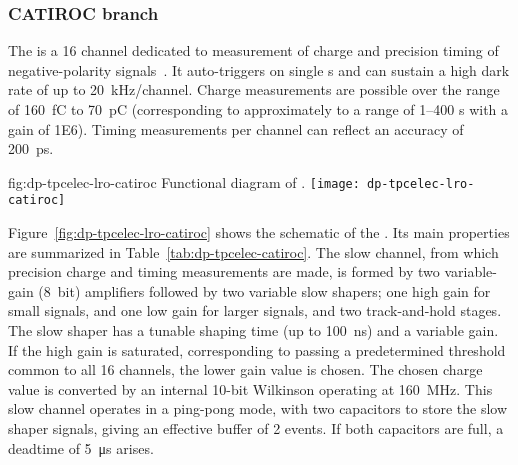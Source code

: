 \subsubsection{CATIROC branch} %

The  is a \num{16} channel  dedicated to measurement of charge and precision timing of negative-polarity  signals~\cite{Blin:2017}. It auto-triggers on single \phel{}s and can sustain a high dark rate of up to \SI{20}{kHz/channel}. Charge measurements are possible over the range of \SI{160}{fC} to \SI{70}{pC} (corresponding to approximately to a range of \numrange{1}{400} \phel{}s with a  gain of \num{1E6}). Timing measurements per channel can %
reflect an accuracy of \SI{200}{ps}.

\begin{dunefigure}{fig:dp-tpcelec-lro-catiroc}
{Functional diagram of  .}
\texttt{[image: dp-tpcelec-lro-catiroc]}
\end{dunefigure}

Figure~\ref{fig:dp-tpcelec-lro-catiroc} shows the schematic of the  . Its main properties are summarized in Table~\ref{tab:dp-tpcelec-catiroc}. The slow channel, from which precision charge and timing measurements are made, is formed by two variable-gain (\SI{8}{bit}) amplifiers followed by two variable slow shapers; one high gain for small signals, and one low gain for larger signals, and two track-and-hold stages. The slow shaper has a tunable shaping time (up to \SI{100}{ns}) and a variable gain.  If the high gain is saturated, corresponding to passing a predetermined threshold common to all \num{16} channels, the lower gain value is chosen. The chosen charge value is converted by an internal 10-bit Wilkinson  operating at \SI{160}{MHz}.  This slow channel operates in a ping-pong mode, with two capacitors to store the slow shaper signals, giving an effective buffer of 2 events. If both capacitors are full, a deadtime of \SI{5}{\micro\second} arises.

